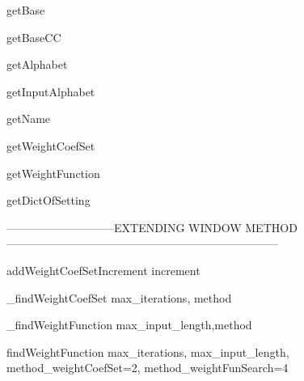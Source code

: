 \begin{method}{getBase}{}

\end{method}


\begin{method}{getBaseCC}{}

\end{method}


\begin{method}{getAlphabet}{}

\end{method}


\begin{method}{getInputAlphabet}{}

\end{method}


\begin{method}{getName}{}

\end{method}


\begin{method}{getWeightCoefSet}{}

\end{method}


\begin{method}{getWeightFunction}{}

\end{method}


\begin{method}{getDictOfSetting}{}

\end{method}


-----------------------------EXTENDING WINDOW METHOD------------------------------------------------------------------------

\begin{method}{addWeightCoefSetIncrement}{ increment}

\end{method}


\begin{method}{\_findWeightCoefSet}{ max\_iterations, method}

\end{method}


\begin{method}{\_findWeightFunction}{ max\_input\_length,method}

\end{method}


\begin{method}{findWeightFunction}{ max\_iterations, max\_input\_length, method\_weightCoefSet=2, method\_weightFunSearch=4}

\end{method}


